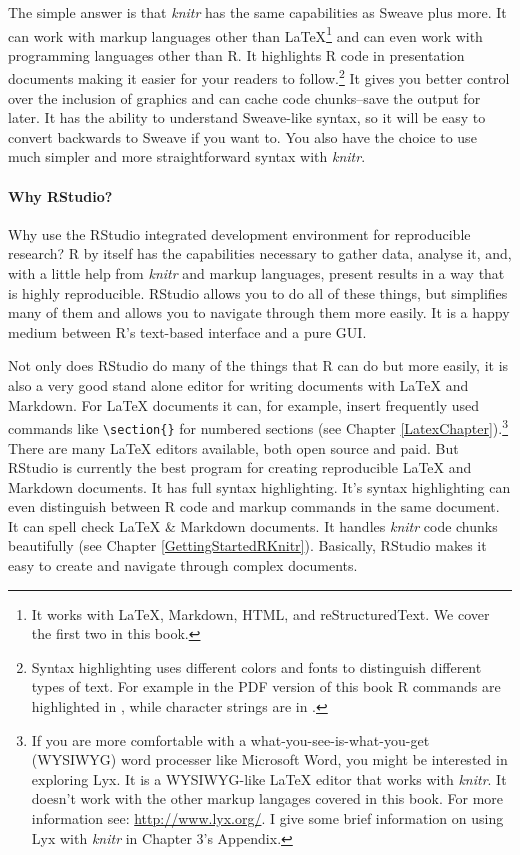 The simple answer is that {\emph{knitr}} has the same capabilities as Sweave plus more. It can work with markup languages other than LaTeX\footnote{It works with LaTeX, Markdown, HTML, and reStructuredText. We cover the first two in this book.} and can even work with programming languages other than R. It highlights R code in presentation documents making it easier for your readers to follow.\footnote{Syntax highlighting uses different colors and fonts to distinguish different types of text. For example in the PDF version of this book R commands are highlighted in , while character strings are in .} It gives you better control over the inclusion of graphics and can cache code chunks--save the output for later. It has the ability to understand Sweave-like syntax, so it will be easy to convert backwards to Sweave if you want to. You also have the choice to use much simpler and more straightforward syntax with {\emph{knitr}}. 

\paragraph{Why RStudio?}

Why use the RStudio integrated development environment for reproducible research? R by itself has the capabilities necessary to gather data, analyse it, and, with a little help from {\emph{knitr}} and markup languages, present results in a way that is highly reproducible. RStudio allows you to do all of these things, but simplifies many of them and allows you to navigate through them more easily. It is a happy medium between R's text-based interface and a pure GUI. 

Not only does RStudio do many of the things that R can do but more easily, it is also a very good stand alone editor for writing documents with LaTeX and Markdown. For LaTeX documents it can, for example, insert frequently used commands like \texttt{\textbackslash{}section\{\}} for numbered sections (see Chapter \ref{LatexChapter}).\footnote{If you are more comfortable with a what-you-see-is-what-you-get (WYSIWYG) word processer like Microsoft Word, you might be interested in exploring Lyx. It is a WYSIWYG-like LaTeX editor that works with {\emph{knitr}}. It doesn't work with the other markup langages covered in this book. For more information see: \url{http://www.lyx.org/}. I give some brief information on using Lyx with \emph{knitr} in Chapter 3's Appendix.}  There are many LaTeX editors available, both open source and paid. But RStudio is currently the best program for creating reproducible LaTeX and Markdown documents. It has full syntax highlighting. It's syntax highlighting can even distinguish between R code and markup commands in the same document. It can spell check LaTeX \& Markdown documents. It handles {\emph{knitr}} code chunks beautifully (see Chapter \ref{GettingStartedRKnitr}). Basically, RStudio makes it easy to create and navigate through complex documents. 


